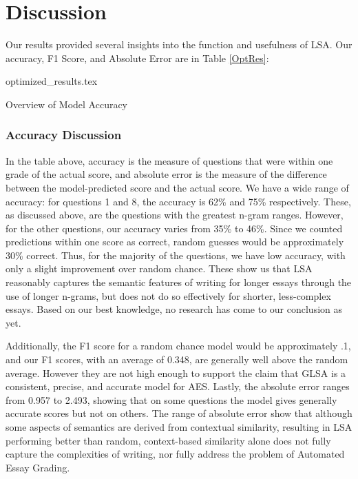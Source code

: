 \documentclass[10pt,letterpaper]{article}
\begin{document}
\section{Discussion}
Our results provided several insights into the function and usefulness of LSA. Our accuracy, F1 Score, and Absolute Error are  in Table \ref{OptRes}:

\begin{table}[h]
\centering
{optimized_results.tex}
\caption{Overview of Model Accuracy}
\label{OptRes}
\end{table}

\subsubsection{Accuracy Discussion}

In the table above, accuracy is the measure of questions that were within one grade of the actual score, and absolute error is the measure of the difference between the model-predicted score and the actual score. We have a wide range of accuracy: for questions 1 and 8, the accuracy is 62\% and 75\% respectively. These, as discussed above, are the questions with the greatest n-gram ranges. However, for the other questions, our accuracy varies from 35\% to 46\%. Since we counted predictions within one score as correct, random guesses would be approximately 30\% correct. Thus, for the majority of the questions, we have low accuracy, with only a slight improvement over random chance. These show us that LSA reasonably captures the semantic features of writing for longer essays through the use of longer n-grams, but does not do so effectively for shorter, less-complex essays. Based on our best knowledge, no research has come to our conclusion as yet.

Additionally, the F1 score for a random chance model would be approximately .1, and our F1 scores, with an average of 0.348, are generally well above the random average. However they are not high enough to support the claim that GLSA is a consistent, precise, and accurate model for AES. Lastly, the absolute error ranges from 0.957 to 2.493, showing that on some questions the model gives generally accurate scores but not on others. The range of absolute error show that although some aspects of semantics are derived from contextual similarity, resulting in LSA performing better than random, context-based similarity alone does not fully capture the complexities of writing, nor fully address the problem of Automated Essay Grading. 
\end{document}
